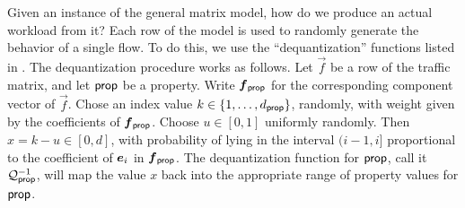 \documentclass[twocolumn,final]{svjour3}
\begin{document}
Given an instance of the general matrix model, how do we produce an actual workload from it?
Each row of the model is used to randomly generate the behavior of a single flow.
To do this, we use the ``dequantization'' functions listed in .
The dequantization procedure works as follows.
Let $\vec{f}$
be a row of the traffic matrix, and let $\text{\textsf{prop}}$ be a property.
Write $\vec{f}_\prop$ for the corresponding component vector of $\vec{f}$.
Chose an index value $k\in{\left\{1,\dots,d_{\text{\textsf{prop}}}\right\}}$, randomly, with weight given by the coefficients of $\vec{f}_\prop$.
Choose $u \in [0,1]$ uniformly randomly.
Then $x = k-u \in [0,d]$, with probability of lying in the interval $(i-1,i]$ proportional to the coefficient of $\e_i$ in $\vec{f}_\prop$.
The dequantization function for $\text{\textsf{prop}}$, call it $\mathcal{Q}^{-1}_{\text{\textsf{prop}}}$, will map the value $x$ back into the appropriate range of property values for $\text{\textsf{prop}}$.
\end{document}
